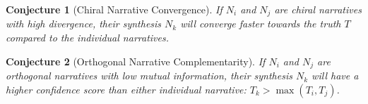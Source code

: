 \documentclass{article}
\newtheorem{conjecture}{Conjecture}
\begin{document}
\begin{conjecture}[Chiral Narrative Convergence]
If $N_i$ and $N_j$ are chiral narratives with high divergence, their synthesis $N_k$ will converge faster towards the truth $T$ compared to the individual narratives.
\end{conjecture}

\begin{conjecture}[Orthogonal Narrative Complementarity]
If $N_i$ and $N_j$ are orthogonal narratives with low mutual information, their synthesis $N_k$ will have a higher confidence score than either individual narrative: $T_k > \max(T_i, T_j)$.
\end{conjecture}
\end{document}
